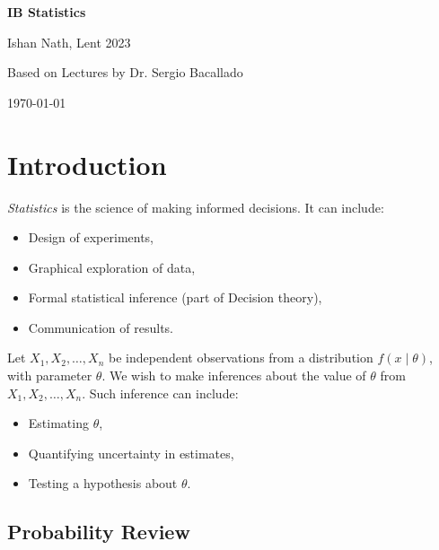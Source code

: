 \documentclass[12pt]{article}
\begin{document}
\hypersetup{pageanchor=false}
\begin{titlepage}
	\begin{center}
		\vspace*{1em}
		\Huge
		\textbf{IB Statistics}

		\vspace{1em}
		\large
		Ishan Nath, Lent 2023

		\vspace{1.5em}

		\Large

		Based on Lectures by Dr. Sergio Bacallado

		\vspace{1em}

		\large
		\today
	\end{center}
	
\end{titlepage}
\hypersetup{pageanchor=true}

\tableofcontents

\newpage

\section{Introduction}
\label{sec:introduction}

\emph{Statistics} is the science of making informed decisions. It can include:
\begin{itemize}
	\item Design of experiments,
	\item Graphical exploration of data,
	\item Formal statistical inference (part of Decision theory),
	\item Communication of results.
\end{itemize}

Let $X_1, X_2, \ldots, X_n$ be independent observations from a distribution $f(x\mid\theta)$, with parameter $\theta$. We wish to make inferences about the value of $\theta$ from $X_1, X_2, \ldots, X_n$. Such inference can include:
\begin{itemize}
	\item Estimating $\theta$,
	\item Quantifying uncertainty in estimates,
	\item Testing a hypothesis about $\theta$.
\end{itemize}

\subsection{Probability Review}
\label{sub:probability_review}
\end{document}
